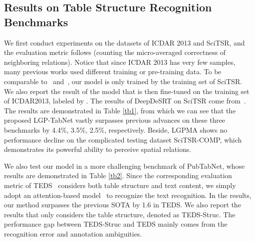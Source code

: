 \documentclass[runningheads]{llncs}
\begin{document}
\subsection{Results on Table Structure Recognition Benchmarks}
We first conduct experiments on the datasets of ICDAR 2013 and SciTSR, and the evaluation metric follows \cite{gobel2013icdar} (counting the micro-averaged correctness of neighboring relations).
Notice that since ICDAR 2013 has very few samples, many previous works used different training or pre-training data. To be comparable to~\cite{chi2019complicated} and~\cite{raja2020table}, our model is only trained by the training set of SciTSR. We also report the result of the model that is then fine-tuned on the training set of ICDAR2013, labeled by . The results of DeepDeSRT on SciTSR come from~\cite{chi2019complicated}.
The results are demonstrated in Table \ref{tb1}, from which we can see that the proposed LGP-TabNet vastly surpasses previous advances on these three benchmarks by 4.4\%, 3.5\%, 2.5\%, respectively. Beside, LGPMA shows no performance decline on the complicated testing dataset SciTSR-COMP, which demonstrates its powerful ability to perceive spatial relations.

We also test our model in a more challenging benchmark of PubTabNet, whose results are demonstrated in Table \ref{tb2}. Since the corresponding evaluation metric of TEDS~\cite{zhong2019image} considers both table structure and text content, we simply adopt an attention-based model~\cite{DBLP:conf/cvpr/LeeO16} to recognize the text recognition. In the results, our method surpasses the previous SOTA by 1.6 in TEDS.  We also report the results that only considers the table structure, denoted as TEDS-Struc. The performance gap between TEDS-Struc and TEDS mainly comes from the recognition error and annotation ambiguities.

\begin{table}[t]
\caption{Results on PubTabNet. TESDS-Struc only considers the table structures.}
\begin{center}
\end{center}
\label{tb2}
\end{table}
\end{document}
